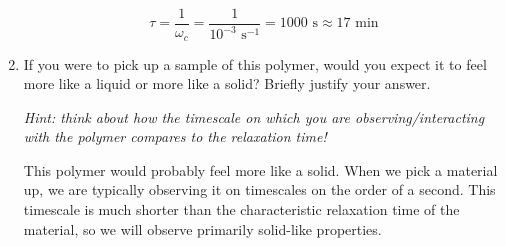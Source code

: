 \begin{activity}
\begin{exercises}
\begin{enumerate}
\begin{solution}
						\begin{equation*}
							\tau = \frac{1}{\omega_c} = \frac{1}{10^{-3}\text{ s}^{-1}} = 1000\text{ s} \approx 17\text{ min}
						\end{equation*}
					\end{solution}
	
			\item If you were to pick up a sample of this polymer, would you expect it to feel more like a liquid or more like a solid?  Briefly justify your answer.
	
			\emph{Hint: think about how the timescale on which you are observing/interacting with the polymer compares to the relaxation time!}
	
					\begin{solution}
					
						This polymer would probably feel more like a solid.  When we pick a material up, we are typically observing it on timescales on the order of a second.  This timescale is much shorter than the characteristic relaxation time of the material, so we will observe primarily solid-like properties.
					
					\end{solution}
					
		\end{enumerate}
		
\end{exercises}
	
\end{activity}